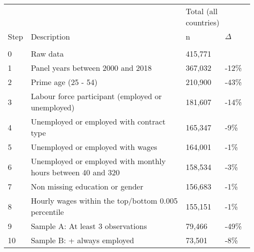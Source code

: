 \begin{tabular}{llll}
   \toprule 
 
&  & 
\multicolumn{2}{l}{Total (all countries)}
\\  
 
 
\multicolumn{1}{l}{Step} & 
\multicolumn{1}{l}{Description} 
& n & $\Delta$
\\ 
\cmidrule(lr){1-2}
\cmidrule(lr){3-4}
\\[-1.8ex]  
 
0 & Raw data & 415,771 &  \\ 
  1 & Panel years between 2000 and 2018 & 367,032 & -12\% \\ 
  2 & Prime age (25 - 54) & 210,900 & -43\% \\ 
  3 & Labour force participant (employed or unemployed) & 181,607 & -14\% \\ 
  4 & Unemployed or employed with contract type & 165,347 & -9\% \\ 
  5 & Unemployed or employed with wages & 164,001 & -1\% \\ 
  6 & Unemployed or employed with monthly hours between 40 and 320 & 158,534 & -3\% \\ 
  7 & Non missing education or gender & 156,683 & -1\% \\ 
  8 & Hourly wages within the top/bottom 0.005 percentile & 155,151 & -1\% \\ 
  9 & Sample A: At least 3 observations & 79,466 & -49\% \\ 
  10 & Sample B: + always employed & 73,501 & -8\% \\ 
   \bottomrule\end{tabular}
